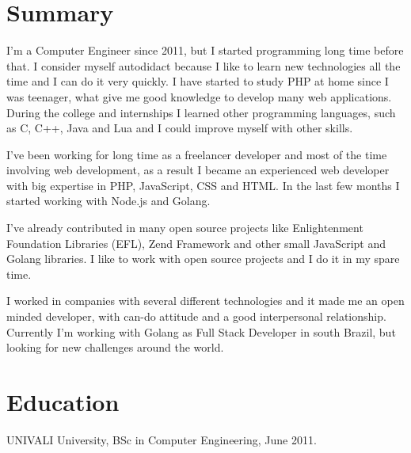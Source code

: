 \documentclass[margin]{res}
\begin{document}
\address{Florianópolis, BR \\ xguiga@gmail.com \\ Phone: +55 (48) 9640-3883 }

\begin{resume}

\section{Summary}
I'm a Computer Engineer since 2011, but I started programming long time before that. I consider myself autodidact because I like to learn new technologies all the time and I can do it very quickly. I have started to study PHP at home since I was teenager, what give me good knowledge to develop many web applications.  During the college and internships I learned other programming languages, such as C, C++, Java and Lua and I could improve myself with other skills.

I've been working for long time as a freelancer developer and most of the time involving web development, as a result I became an experienced web developer with big expertise in PHP, JavaScript, CSS and HTML. In the last few months I started working with Node.js and Golang. 

I've already contributed in many open source projects like Enlightenment Foundation Libraries (EFL), Zend Framework and other small JavaScript and Golang libraries. I like to work with open source projects and I do it in my spare time.

I worked in companies with several different technologies and it made me an open minded developer, with can-do attitude and a good interpersonal relationship. Currently I’m working with Golang as Full Stack Developer in south Brazil, but looking for new challenges around the world.

\section{Education} UNIVALI University, BSc in Computer Engineering, June 2011.


\end{resume}
\end{document}
